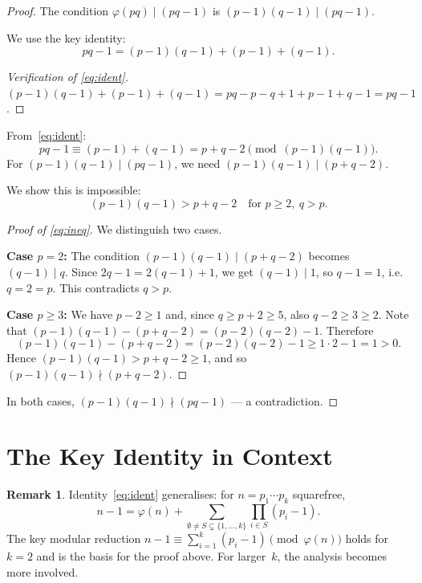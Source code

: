 \documentclass[12pt,a4paper]{amsart}
\theoremstyle{definition}
\newtheorem{remark}[theorem]{Remark}
\newcommand{\euler}{\varphi}
\begin{document}
\begin{proof}
The condition $\euler(pq) \mid (pq - 1)$ is $(p-1)(q-1) \mid (pq - 1)$.

We use the key identity:
\begin{equation}
  pq - 1 = (p-1)(q-1) + (p-1) + (q-1).
  \label{eq:ident}
\end{equation}

\begin{proof}[Verification of \eqref{eq:ident}]
$(p-1)(q-1) + (p-1) + (q-1) = pq - p - q + 1 + p - 1 + q - 1 = pq - 1$. \checkmark
\end{proof}

From~\eqref{eq:ident}:
\[
  pq - 1 \equiv (p-1) + (q-1) = p + q - 2 \pmod{(p-1)(q-1)}.
\]
For $(p-1)(q-1) \mid (pq-1)$, we need $(p-1)(q-1) \mid (p + q - 2)$.

We show this is impossible:
\begin{equation}
  (p-1)(q-1) > p + q - 2 \quad \text{for } p \ge 2,\ q > p.
  \label{eq:ineq}
\end{equation}

\begin{proof}[Proof of \eqref{eq:ineq}]
We distinguish two cases.

\textbf{Case $p = 2$:} The condition $(p-1)(q-1) \mid (p+q-2)$ becomes $(q-1) \mid q$.
Since $2q - 1 = 2(q-1) + 1$, we get $(q-1) \mid 1$, so $q - 1 = 1$, i.e.\ $q = 2 = p$.
This contradicts $q > p$.

\textbf{Case $p \ge 3$:} We have $p - 2 \ge 1$ and, since $q \ge p + 2 \ge 5$, also $q - 2 \ge 3 \ge 2$.
Note that $(p-1)(q-1) - (p+q-2) = (p-2)(q-2) - 1$.  Therefore
\[
  (p-1)(q-1) - (p+q-2) = (p-2)(q-2) - 1 \ge 1 \cdot 2 - 1 = 1 > 0.
\]
Hence $(p-1)(q-1) > p + q - 2 \ge 1$, and so $(p-1)(q-1) \nmid (p+q-2)$.
\end{proof}

In both cases, $(p-1)(q-1) \nmid (pq-1)$ — a contradiction.
\end{proof}

\section{The Key Identity in Context}

\begin{remark}
Identity~\eqref{eq:ident} generalises: for $n = p_1 \cdots p_k$ squarefree,
\[
  n - 1 = \varphi(n) + \sum_{\emptyset \ne S \subsetneq \{1,\ldots,k\}} \prod_{i \in S}(p_i - 1).
\]
The key modular reduction $n - 1 \equiv \sum_{i=1}^{k}(p_i - 1) \pmod{\euler(n)}$
holds for $k = 2$ and is the basis for the proof above.  For larger~$k$, the
analysis becomes more involved.
\end{remark}
\end{document}
